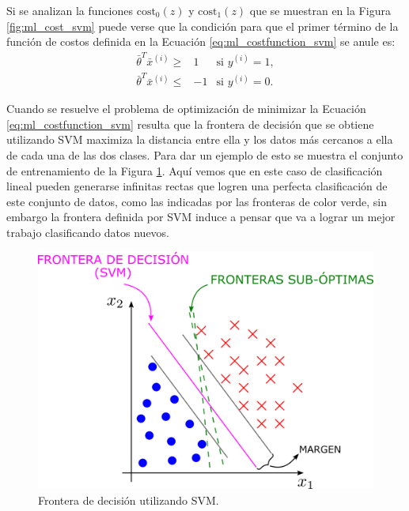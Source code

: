 Si se analizan la funciones $\mathrm{cost}_0(z)$ y $\mathrm{cost}_1(z)$ que se muestran en la Figura \ref{fig:ml_cost_svm} puede verse que la condición para que el primer término de la función de costos definida en la Ecuación \ref{eq:ml_costfunction_svm} se anule es:
\begin{equation}
  \begin{matrix}
    \bar{\theta}^T \bar{x}^{(i)}  \geq & 1  & \textrm{si } y^{(i)} = 1, \\
    \bar{\theta}^T \bar{x}^{(i)}  \leq & -1 & \textrm{si } y^{(i)} = 0.
  \end{matrix}
  \label{eq:ml_cond_svm}
\end{equation}

Cuando se resuelve el problema de optimización de minimizar la Ecuación \ref{eq:ml_costfunction_svm} resulta que la frontera de decisión que se obtiene utilizando SVM maximiza la distancia entre ella y los datos más cercanos a ella de cada una de las dos clases. Para dar un ejemplo de esto se muestra el conjunto de entrenamiento de la Figura \ref{fig:ml_db_svm}. Aquí vemos que en este caso de clasificación lineal pueden generarse infinitas rectas que logren una perfecta clasificación de este conjunto de datos, como las indicadas por las fronteras de color verde, sin embargo la frontera definida por SVM induce a pensar que va a lograr un mejor trabajo clasificando datos nuevos.
\begin{figure}[ht!]
  \centering
  \includegraphics[width=0.8\linewidth]{images/05-Machine Learning/ml_db_svm.png}
  \caption{Frontera de decisión utilizando SVM.}
  \label{fig:ml_db_svm}
\end{figure}


